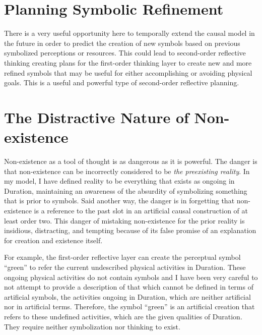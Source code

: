 \section{Planning Symbolic Refinement}

There is a very useful opportunity here to temporally extend the
causal model in the future in order to predict the creation of new
symbols based on previous symbolized perceptions or resources.  This
could lead to second-order reflective thinking creating plans for the
first-order thinking layer to create new and more refined symbols that
may be useful for either accomplishing or avoiding physical goals.
This is a useful and powerful type of second-order reflective
planning.

\section{The Distractive Nature of Non-existence}

Non-existence as a tool of thought is as dangerous as it is powerful.
The danger is that non-existence can be incorrectly considered to be
\emph{the preexisting reality}.  In my model, I have defined reality
to be everything that exists as ongoing in Duration, maintaining an
awareness of the absurdity of symbolizing something that is prior to
symbols.  Said another way, the danger is in forgetting that
non-existence is a reference to the past slot in an artificial causal
construction of at least order two.  This danger of mistaking
non-existence for the prior reality is insidious, distracting, and
tempting because of its false promise of an explanation for creation
and existence itself.

For example, the first-order reflective layer can create the
perceptual symbol ``green'' to refer the current undescribed physical
activities in Duration.  These ongoing physical activities do not
contain symbols and I have been very careful to not attempt to provide
a description of that which cannot be defined in terms of artificial
symbols, the activities ongoing in Duration, which are neither
artificial nor in artificial terms.  Therefore, the symbol ``green''
is an artificial creation that refers to these undefined activities,
which are the given qualities of Duration.  They require neither
symbolization nor thinking to exist.

